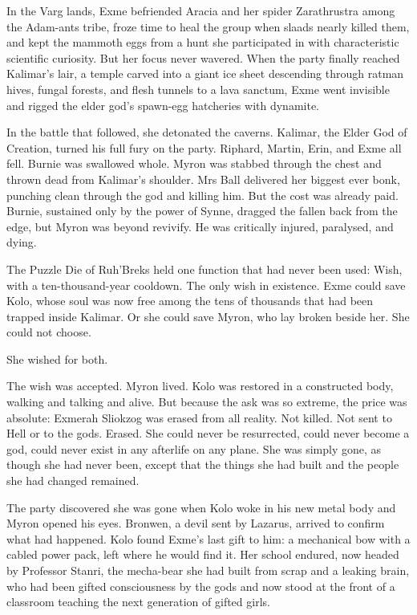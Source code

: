 In the Varg lands, Exme befriended Aracia and her spider Zarathrustra among the Adam-ants tribe, froze time to heal the group when slaads nearly killed them, and kept the mammoth eggs from a hunt she participated in with characteristic scientific curiosity.  But her focus never wavered.  When the party finally reached Kalimar's lair, a temple carved into a giant ice sheet descending through ratman hives, fungal forests, and flesh tunnels to a lava sanctum, Exme went invisible and rigged the elder god's spawn-egg hatcheries with dynamite.

In the battle that followed, she detonated the caverns.  Kalimar, the Elder God of Creation, turned his full fury on the party.  Riphard, Martin, Erin, and Exme all fell.  Burnie was swallowed whole.  Myron was stabbed through the chest and thrown dead from Kalimar's shoulder.  Mrs Ball delivered her biggest ever bonk, punching clean through the god and killing him.  But the cost was already paid.  Burnie, sustained only by the power of Synne, dragged the fallen back from the edge, but Myron was beyond revivify.  He was critically injured, paralysed, and dying.

The Puzzle Die of Ruh'Breks held one function that had never been used: Wish, with a ten-thousand-year cooldown.  The only wish in existence.  Exme could save Kolo, whose soul was now free among the tens of thousands that had been trapped inside Kalimar.  Or she could save Myron, who lay broken beside her.  She could not choose.

She wished for both.

The wish was accepted.  Myron lived.  Kolo was restored in a constructed body, walking and talking and alive.  But because the ask was so extreme, the price was absolute: Exmerah Sliokzog was erased from all reality.  Not killed.  Not sent to Hell or to the gods.  Erased.  She could never be resurrected, could never become a god, could never exist in any afterlife on any plane.  She was simply gone, as though she had never been, except that the things she had built and the people she had changed remained.

The party discovered she was gone when Kolo woke in his new metal body and Myron opened his eyes.  Bronwen, a devil sent by Lazarus, arrived to confirm what had happened.  Kolo found Exme's last gift to him: a mechanical bow with a cabled power pack, left where he would find it.  Her school endured, now headed by Professor Stanri, the mecha-bear she had built from scrap and a leaking brain, who had been gifted consciousness by the gods and now stood at the front of a classroom teaching the next generation of gifted girls.

